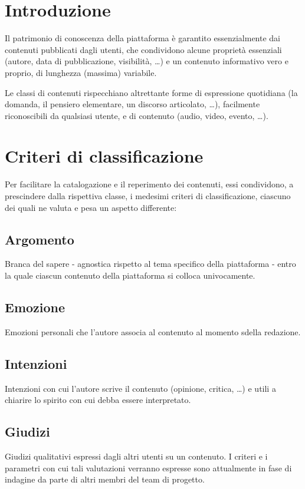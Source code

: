 \documentclass[10pt,a4paper,headinclude,footinclude,hidelinks]{scrreprt} %
\begin{document}
	\section{Introduzione}
	Il patrimonio di conoscenza della piattaforma è garantito essenzialmente dai contenuti pubblicati dagli utenti, che condividono alcune proprietà essenziali (autore, data di pubblicazione, visibilità, \ldots) e un contenuto informativo vero e proprio, di lunghezza (massima) variabile.

	Le classi di contenuti rispecchiano altrettante forme di espressione quotidiana (la domanda, il pensiero elementare, un discorso articolato, \ldots), facilmente riconoscibili da qualsiasi utente, e di contenuto (audio, video, evento, \ldots).

	\section{Criteri di classificazione}
	Per facilitare la catalogazione e il reperimento dei contenuti, essi condividono, a prescindere dalla rispettiva classe, i medesimi criteri di classificazione, ciascuno dei quali ne valuta e pesa un aspetto differente:
	\subsection{Argomento}
	Branca del sapere - agnostica rispetto al tema specifico della piattaforma - entro la quale ciascun contenuto della piattaforma si colloca univocamente.
	\subsection{Emozione}
	Emozioni personali che l'autore associa al contenuto al momento sdella redazione.
	\subsection{Intenzioni}
	Intenzioni con cui l'autore scrive il contenuto (opinione, critica, \ldots) e utili a chiarire lo spirito con cui debba essere interpretato.
	\subsection{Giudizi}
	Giudizi qualitativi espressi dagli altri utenti su un contenuto. I criteri e i parametri con cui tali valutazioni verranno espresse sono attualmente in fase di indagine da parte di altri membri del team di progetto.
\end{document}
